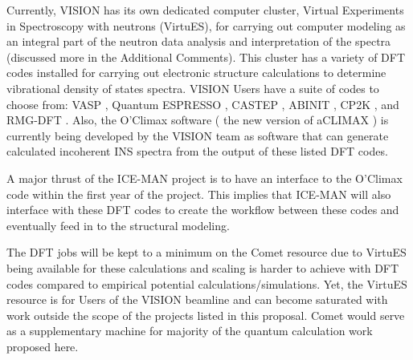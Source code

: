 Currently, VISION \cite{VISIONwebsite} has its own dedicated computer cluster, Virtual Experiments  in Spectroscopy  with neutrons (VirtuES), for carrying out  computer modeling as an integral part of the neutron data analysis and interpretation of the spectra (discussed more in the Additional Comments). This cluster has a variety of DFT codes installed for carrying out electronic structure calculations to determine vibrational density of states spectra. VISION Users have a suite of codes to choose from: VASP \cite{Kresse1996, Kresse1996a, VASPwebsite}, Quantum ESPRESSO \cite{Giannozzi2009, QEwebsite}, CASTEP \cite{Clark2005, CASTEPwebiste} , ABINIT \cite{ Gonze2002, Gonze2009, CASTEPwebsite}, CP2K \cite{Hutter2014, CP2Kwebsite} , and RMG-DFT \cite{Briggs1996, RMGDFTwebsite}. Also, the O'Climax software ( the new version of aCLIMAX \cite{Ramirez-Cuest2004}) is currently being developed by the VISION team as software that can generate calculated incoherent INS spectra from the output of these listed DFT codes. 

A major thrust of the ICE-MAN project is to have an interface to the O'Climax code within the first year of the project. This implies that ICE-MAN will also interface with these DFT codes to create the workflow between these codes and eventually feed in to the structural modeling. 

The DFT jobs will be kept to a minimum on the Comet resource due to VirtuES being available for these calculations and scaling is harder to achieve with DFT codes compared to empirical potential calculations/simulations. Yet, the VirtuES resource is for Users of the VISION beamline and can become saturated with work outside the scope of the projects listed in this proposal. Comet would serve as a supplementary machine for majority of the quantum calculation work proposed here.  